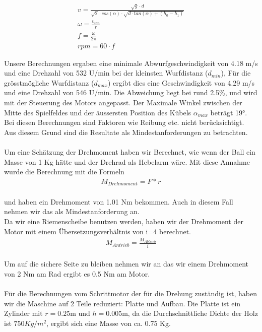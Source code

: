 \begin{gather}
	v=\frac{\sqrt{g} \cdot d}{\sqrt{2} \cdot cos(\alpha) \cdot \sqrt{d \cdot tan(\alpha)+(h_0-h_1)}}\\
	\omega=\frac{v_{tan}}{r}\\
	f=\frac{\omega}{2\pi}\\
	rpm=60 \cdot f
\end{gather}

Unsere Berechnungen ergaben eine minimale Abwurfgeschwindigkeit von 4.18 m/s und eine Drehzahl von 532 U/min bei der kleinsten Wurfdistanz ($d_{min}$), 
Für die grösstmögliche Wurfdistanz ($d_{max}$) ergibt dies  eine Geschwindigkeit von 4.29 m/s und eine Drehzahl von 546 U/min. 
Die Abweichung liegt bei rund 2.5\%, und wird mit der Steuerung des Motors angepasst.
Der Maximale Winkel zwischen der Mitte des Spielfeldes und der äussersten Position des Kübels $\alpha_{max}$ beträgt 19°. \\
Bei diesen Berechnungen sind Faktoren wie Reibung etc. nicht berücksichtigt. Aus diesem Grund sind die Resultate als Mindestanforderungen zu betrachten.\\ \\
Um eine Schätzung der Drehmoment haben wir Berechnet, wie wenn der Ball ein Masse von 1 Kg hätte und der Drehrad als Hebelarm wäre. Mit diese Annahme wurde die Berechnung mit die Formeln\\
\begin{gather}
	M_{Drehmoment}=F*r
\end{gather}\\
und haben ein Drehmoment von 1.01 Nm bekommen. Auch in diesem Fall nehmen wir das als Mindestanforderung an.\\
Da wir eine Riemenscheibe benutzen werden, haben wir der Drehmoment der Motor mit einem Übersetzungsverhältnis von i=4 berechnet.\\
\begin{gather}
	M_{Antrieb}=\frac{M_{Abtrieb}}{i}
\end{gather}\\
Um auf die sichere Seite zu bleiben nehmen wir an das wir einem Drehmoment von 2 Nm am Rad ergibt es 0.5 Nm am Motor.\\ \\
Für die Berechnungen vom Schrittmotor der für die Drehung zuständig ist, haben wir die Maschine auf 2 Teile reduziert: Platte und Aufbau.
Die Platte ist ein Zylinder mit $r=0.25$m und $h=0.005$m, da die Durchschnittliche Dichte der Holz ist $750 Kg/m^2$, ergibt sich eine Masse von ca. 0.75 Kg.
